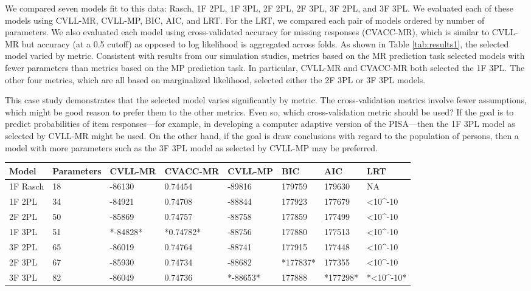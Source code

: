 \documentclass[
  english,
  man,floatsintext]{apa7}
\begin{document}
We compared seven models fit to this data: Rasch, 1F 2PL, 1F 3PL, 2F 2PL, 2F 3PL, 3F 2PL, and 3F 3PL. We evaluated each of these models using CVLL-MR, CVLL-MP, BIC, AIC, and LRT. For the LRT, we compared each pair of models ordered by number of parameters. We also evaluated each model using cross-validated accuracy for missing responses (CVACC-MR), which is similar to CVLL-MR but accuracy (at a 0.5 cutoff) as opposed to log likelihood is aggregated across folds. As shown in Table \ref{tab:results1}, the selected model varied by metric. Consistent with results from our simulation studies, metrics based on the MR prediction task selected models with fewer parameters than metrics based on the MP prediction task. In particular, CVLL-MR and CVACC-MR both selected the 1F 3PL. The other four metrics, which are all based on marginalized likelihood, selected either the 2F 3PL or 3F 3PL models.

This case study demonstrates that the selected model varies significantly by metric. The cross-validation metrics involve fewer assumptions, which might be good reason to prefer them to the other metrics. Even so, which cross-validation metric should be used? If the goal is to predict probabilities of item responses---for example, in developing a computer adaptive version of the PISA---then the 1F 3PL model as selected by CVLL-MR might be used. On the other hand, if the goal is draw conclusions with regard to the population of persons, then a model with more parameters such as the 3F 3PL model as selected by CVLL-MP may be preferred.

\centering
\fontsize{6}{8}\selectfont
\begin{small}
\begin{tabular}[t]{llllllll}
\toprule
Model & Parameters & CVLL-MR & CVACC-MR & CVLL-MP & BIC & AIC & LRT\\
\midrule
1F Rasch & 18 & -86130 & 0.74454   & -89816 & 179759  & 179630 & NA\\
1F 2PL & 34 & -84921 & 0.74708     & -88844 & 177923  & 177679 & <10\textasciicircum{}-10\\
2F 2PL & 50 & -85869 & 0.74757     & -88758 & 177859  & 177499 & <10\textasciicircum{}-10\\
1F 3PL & 51 & *-84828* & *0.74782* & -88756 & 177880  & 177513 & <10\textasciicircum{}-10\\
3F 2PL & 65 & -86019 & 0.74764     & -88741 & 177915  & 177448 & <10\textasciicircum{}-10\\
2F 3PL & 67 & -85930 & 0.74734     & -88682 & *177837*  & 177355 & <10\textasciicircum{}-10\\
3F 3PL & 82 & -86049 & 0.74736     & *-88653* & 177888  & *177298* & *<10\textasciicircum{}-10*\\
\bottomrule
\end{tabular}
\label{tab:inpractice}
\end{small}
\end{document}
